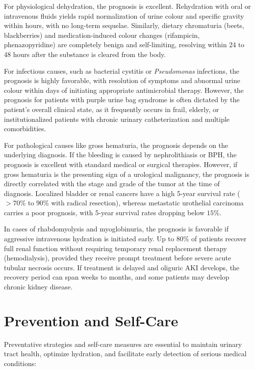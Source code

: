 For physiological dehydration, the prognosis is excellent. Rehydration with oral or intravenous fluids yields rapid normalization of urine colour and specific gravity within hours, with no long-term sequelae. Similarly, dietary chromaturia (beets, blackberries) and medication-induced colour changes (rifampicin, phenazopyridine) are completely benign and self-limiting, resolving within 24 to 48 hours after the substance is cleared from the body.

For infectious causes, such as bacterial cystitis or \textit{Pseudomonas} infections, the prognosis is highly favorable, with resolution of symptoms and abnormal urine colour within days of initiating appropriate antimicrobial therapy. However, the prognosis for patients with purple urine bag syndrome is often dictated by the patient's overall clinical state, as it frequently occurs in frail, elderly, or institutionalized patients with chronic urinary catheterization and multiple comorbidities.

For pathological causes like gross hematuria, the prognosis depends on the underlying diagnosis. If the bleeding is caused by nephrolithiasis or BPH, the prognosis is excellent with standard medical or surgical therapies. However, if gross hematuria is the presenting sign of a urological malignancy, the prognosis is directly correlated with the stage and grade of the tumor at the time of diagnosis. Localized bladder or renal cancers have a high 5-year survival rate ($>70\%$ to $90\%$ with radical resection), whereas metastatic urothelial carcinoma carries a poor prognosis, with 5-year survival rates dropping below $15\%$.

In cases of rhabdomyolysis and myoglobinuria, the prognosis is favorable if aggressive intravenous hydration is initiated early. Up to 80\% of patients recover full renal function without requiring temporary renal replacement therapy (hemodialysis), provided they receive prompt treatment before severe acute tubular necrosis occurs. If treatment is delayed and oliguric AKI develops, the recovery period can span weeks to months, and some patients may develop chronic kidney disease.

\section*{Prevention and Self-Care}
Preventative strategies and self-care measures are essential to maintain urinary tract health, optimize hydration, and facilitate early detection of serious medical conditions:

